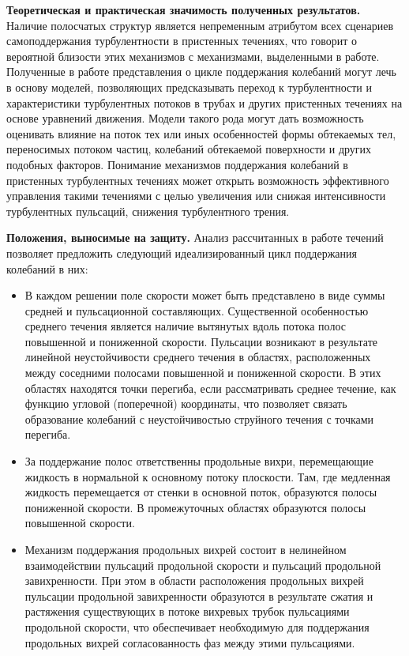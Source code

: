 {\bf Теоретическая и практическая значимость полученных результатов.}
Наличие полосчатых структур является непременным атрибутом всех сценариев самоподдержания турбулентности в пристенных течениях, что говорит о вероятной близости этих механизмов с механизмами, выделенными в работе. Полученные в работе представления о цикле поддержания колебаний могут лечь в основу моделей, позволяющих предсказывать переход к турбулентности и характеристики турбулентных потоков в трубах и других пристенных течениях на основе уравнений движения. Модели такого рода могут дать возможность оценивать влияние на поток тех или иных особенностей формы обтекаемых тел, переносимых потоком частиц, колебаний обтекаемой поверхности и других подобных факторов. Понимание механизмов поддержания колебаний в пристенных турбулентных течениях может открыть возможность эффективного управления такими течениями с целью увеличения или снижая интенсивности турбулентных пульсаций, снижения турбулентного трения.


{\bf Положения, выносимые на защиту.} Анализ рассчитанных в работе течений позволяет предложить следующий идеализированный цикл поддержания колебаний в них:
\begin{itemize}
\item В каждом решении поле скорости может быть представлено в виде суммы средней и пульсационной составляющих. Существенной особенностью среднего течения является наличие вытянутых вдоль потока полос повышенной и пониженной скорости. Пульсации возникают в результате линейной неустойчивости среднего течения в областях, расположенных между соседними полосами повышенной и пониженной скорости. В этих областях находятся точки перегиба, если рассматривать среднее течение, как функцию угловой (поперечной) координаты, что позволяет связать образование колебаний с неустойчивостью струйного течения с точками перегиба. 
\item За поддержание полос ответственны продольные вихри, перемещающие жидкость в нормальной к основному потоку плоскости. Там, где медленная жидкость перемещается от стенки в основной поток, образуются полосы пониженной скорости. В промежуточных областях образуются полосы повышенной скорости. 
\item Механизм поддержания продольных вихрей состоит в нелинейном взаимодействии пульсаций продольной скорости и пульсаций продольной завихренности. При этом в области расположения продольных вихрей пульсации продольной завихренности образуются в результате сжатия и растяжения существующих в потоке вихревых трубок пульсациями продольной скорости, что обеспечивает необходимую для поддержания продольных вихрей согласованность фаз между этими пульсациями. 
\end{itemize}

